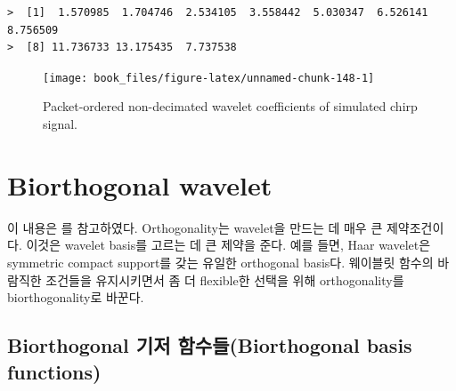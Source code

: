 \documentclass[b5paper,]{scrbook}
\makeatletter
\newenvironment{Shaded}{\begin{snugshade}}{\end{snugshade}}
\newcommand{\KeywordTok}[1]{\textcolor[rgb]{0.13,0.29,0.53}{\textbf{{#1}}}}
\newcommand{\DataTypeTok}[1]{\textcolor[rgb]{0.13,0.29,0.53}{{#1}}}
\newcommand{\DecValTok}[1]{\textcolor[rgb]{0.00,0.00,0.81}{{#1}}}
\newcommand{\StringTok}[1]{\textcolor[rgb]{0.31,0.60,0.02}{{#1}}}
\newcommand{\NormalTok}[1]{{#1}}
\theoremstyle{plain}
\theoremstyle{definition}
\numberwithin{equation}{section}
\newenvironment{kframe}{%
\medskip{}
\setlength{\fboxsep}{.8em}
 \def\at@end@of@kframe{}%
 \ifinner\ifhmode%
  \def\at@end@of@kframe{\end{minipage}}%
  \begin{minipage}{\columnwidth}%
 \fi\fi%
 \def\FrameCommand##1{\hskip\@totalleftmargin \hskip-\fboxsep
 \colorbox{shadecolor}{##1}\hskip-\fboxsep
     \hskip-\linewidth \hskip-\@totalleftmargin \hskip\columnwidth}%
 \MakeFramed {\advance\hsize-\width
   \@totalleftmargin\z@ \linewidth\hsize
   \@setminipage}}%
 {\par\unskip\endMakeFramed%
 \at@end@of@kframe}
\renewenvironment{Shaded}{\begin{kframe}}{\end{kframe}}
\makeatother
\begin{document}
\begin{verbatim}
>  [1]  1.570985  1.704746  2.534105  3.558442  5.030347  6.526141  8.756509
>  [8] 11.736733 13.175435  7.737538
\end{verbatim}

\begin{Shaded}
\end{Shaded}

\begin{figure}

{\centering \texttt{[image: book\_files/figure-latex/unnamed-chunk-148-1]} 

}

\caption{Packet-ordered non-decimated wavelet coefficients of simulated chirp signal.}\label{fig:unnamed-chunk-148}
\end{figure}

\section{Biorthogonal wavelet}\label{biorthogonal-wavelet}

이 내용은 \citep{Gomes2015}를 참고하였다. Orthogonality는 wavelet을
만드는 데 매우 큰 제약조건이다. 이것은 wavelet basis를 고르는 데 큰
제약을 준다. 예를 들면, Haar wavelet은 symmetric compact support를 갖는
유일한 orthogonal basis다. 웨이블릿 함수의 바람직한 조건들을
유지시키면서 좀 더 flexible한 선택을 위해 orthogonality를
biorthogonality로 바꾼다.

\subsection{Biorthogonal 기저 함수들(Biorthogonal basis
functions)}\label{biorthogonal--biorthogonal-basis-functions}
\end{document}
